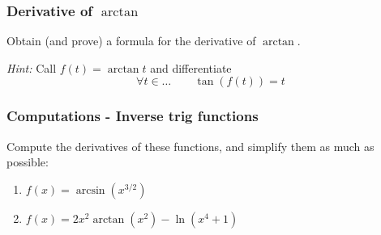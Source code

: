 \documentclass[14pt]{beamer}
\begin{document}

	\begin{frame}[t]
		\frametitle{Derivative of $\arctan$}

		\begin{block}{}
			Obtain (and prove) a formula for the derivative of $\arctan$.
		\end{block}

		\emph{Hint:} Call $\displaystyle f(t) = \arctan t$ and differentiate
		\[
			\forall t \in \ldots \quad \quad \tan ( f(t)) = t
		\]
	\end{frame}

	\begin{frame}[t]
		\frametitle{Computations - Inverse trig functions}

		Compute the derivatives of these functions, and simplify them as much as possible:
		\begin{enumerate}
			\item $\displaystyle f(x) = \arcsin \left( x^{3/2}\right)$
				\vfill

			\item $\displaystyle f(x)=2x^{2}\arctan (x^{2}) - \ln (x^{4}+1)$
				\vfill
		\end{enumerate}
	\end{frame}

\end{document}
